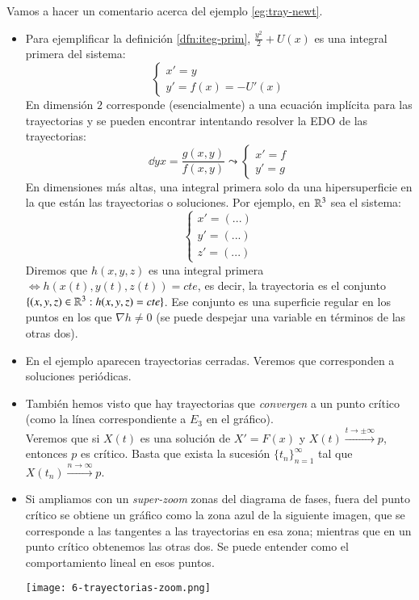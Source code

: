 \begin{obs}
    Vamos a hacer un comentario acerca del ejemplo \ref{eg:tray-newt}.
    \begin{itemize}
    \item Para ejemplificar la definición \ref{dfn:iteg-prim}, $\frac{y^2}{2} + U(x)$ es una integral primera del sistema:
    $$
    \begin{cases}
        x' = y\\
        y' = f(x) = -U'(x)
    \end{cases}
    $$
    En dimensión $2$ corresponde (esencialmente) a una ecuación implícita para las trayectorias y se pueden encontrar intentando resolver la EDO de las trayectorias:
    $$
    \dd{y}{x} = \frac{g(x, y)}{f(x, y)} \leadsto
    \begin{cases}
        x' = f\\
        y' = g
    \end{cases}
    $$
    En dimensiones más altas, una integral primera solo da una hipersuperficie en la que están las trayectorias o soluciones.
    Por ejemplo, en $\mathbb{R}^3$ sea el sistema:
    $$
    \begin{cases}
        x' = (...)\\
        y' = (...)\\
        z' = (...)
    \end{cases}
    $$
    Diremos que $h(x, y, z)$ es una integral primera $\iff h(x(t), y(t), z(t)) = cte$, es decir, la trayectoria es el conjunto $\{(x, y, z) \in \mathbb{R}^3 : h(x, y, z) = cte\}$. Ese conjunto es una superficie regular en los puntos en los que $\nabla h \neq 0$ (se puede despejar una variable en términos de las otras dos).
    \item En el ejemplo aparecen trayectorias cerradas. Veremos que corresponden a soluciones periódicas.
    \item También hemos visto que hay trayectorias que \textit{convergen} a un punto crítico (como la línea correspondiente a $E_3$ en el gráfico).\\
    Veremos que si $X(t)$ es una solución de $X' = F(x)$ y $X(t) \xrightarrow{t \to \pm \infty} p$, entonces $p$ es crítico. Basta que exista la sucesión $\{t_n\}_{n=1}^{\infty}$ tal que $X(t_n) \xrightarrow{n \to \infty} p$.
    \item Si ampliamos con un \textit{super-zoom} zonas del diagrama de fases, fuera del punto crítico se obtiene un gráfico como la zona azul de la siguiente imagen, que se corresponde a las tangentes a las trayectorias en esa zona; mientras que en un punto crítico obtenemos las otras dos. Se puede entender como el comportamiento lineal en esos puntos.
    \begin{center}
        \texttt{[image: 6-trayectorias-zoom.png]}
    \end{center}
    \end{itemize}
\end{obs}
